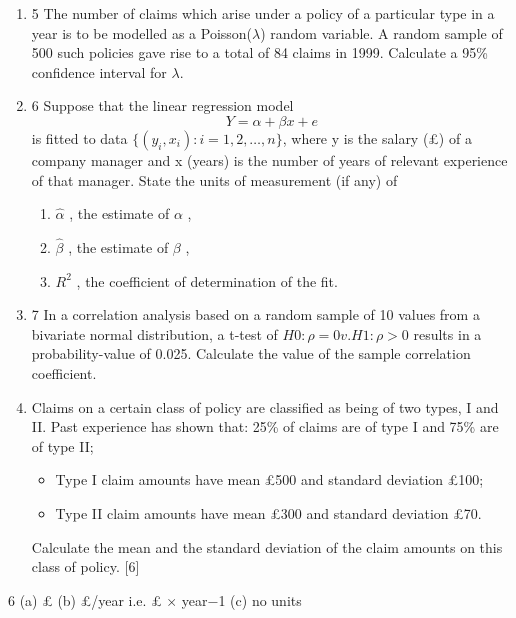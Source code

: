 \documentclass[a4paper,12pt]{article}
\begin{document}
\begin{enumerate}
\item 5 The number of claims which arise under a policy of a particular type in a year is
to be modelled as a Poisson($\lambda$) random variable. A random sample of 500 such policies gave rise to a total of 84 claims in 1999.
Calculate a 95\% confidence interval for $\lambda$. 
\item 6 Suppose that the linear regression model
\[Y = \alpha + \beta x + e\]
is fitted to data $\{(y_i , x_i) : i = 1, 2, \ldots , n\}$, where y is the salary (£) of a company
manager and x (years) is the number of years of relevant experience of that
manager.
State the units of measurement (if any) of
\begin{enumerate}
    \item  $\hat{\alpha}$ , the estimate of $\alpha$ ,
\item $\hat{\beta}$ , the estimate of $\beta$ ,
\item $R^2$ , the coefficient of determination of the fit. 
\end{enumerate}

\newpage

\item 7 In a correlation analysis based on a random sample of 10 values from a bivariate
normal distribution, a t-test of
$H0 : \rho = 0 v. H1 : \rho > 0$
results in a probability-value of 0.025.
Calculate the value of the sample correlation coefficient. 
\newpage
\item  Claims on a certain class of policy are classified as being of two types, I and II.
Past experience has shown that:
25\% of claims are of type I and 75\% are of type II;
\begin{itemize}
    \item Type I claim amounts have mean £500 and standard deviation £100;
\item Type II claim amounts have mean £300 and standard deviation £70.
\end{itemize}

Calculate the mean and the standard deviation of the claim amounts on this
class of policy. [6]
\end{enumerate}
6 (a) £
(b) £/year i.e. £ × year−1
(c) no units
\end{document}
